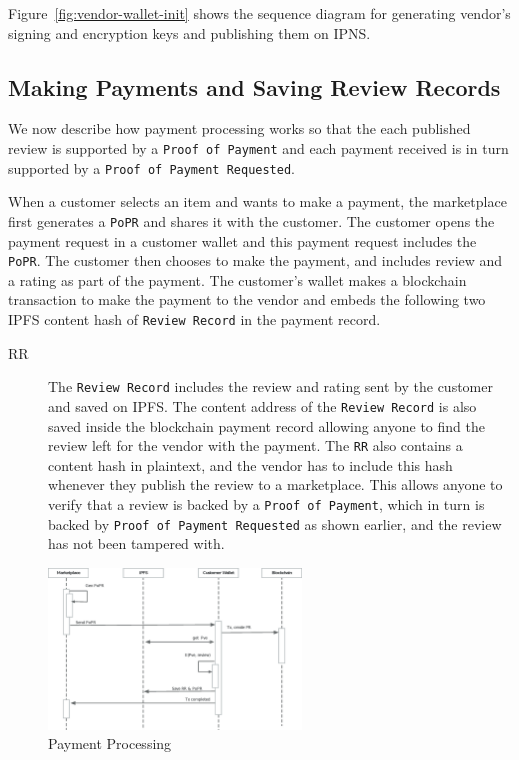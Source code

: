 \documentclass[a4paper]{article}
\begin{document}
Figure~\ref{fig:vendor-wallet-init} shows the sequence diagram for
generating vendor's signing and encryption keys and publishing them on
IPNS\@.

\subsection{Making Payments and Saving Review Records}

We now describe how payment processing works so that the each
published review is supported by a \texttt{Proof of Payment} and each
payment received is in turn supported by a \texttt{Proof of Payment
  Requested}.

When a customer selects an item and wants to make a payment, the
marketplace first generates a \texttt{PoPR} and shares it with the
customer. The customer opens the payment request in a customer wallet
and this payment request includes the \texttt{PoPR}. The customer then
chooses to make the payment, and includes review and a rating as part
of the payment. The customer's wallet makes a blockchain transaction
to make the payment to the vendor and embeds the following two IPFS
content hash of \texttt{Review Record} in the payment record.

\begin{description}
\item[RR] The \texttt{Review Record} includes the review and rating
  sent by the customer and saved on IPFS. The content address of the
  \texttt{Review Record} is also saved inside the blockchain payment
  record allowing anyone to find the review left for the vendor with
  the payment. The \texttt{RR} also contains a content hash in
  plaintext, and the vendor has to include this hash whenever they
  publish the review to a marketplace. This allows anyone to verify
  that a review is backed by a \texttt{Proof of Payment}, which in
  turn is backed by \texttt{Proof of Payment Requested} as shown
  earlier, and the review has not been tampered with.
\end{description}

\begin{figure}
\centering
\includegraphics[width=0.6\textwidth]{../payment-processing.eps}
\caption{\label{fig:payment-processing}{Payment Processing}}
\end{figure}
\end{document}
